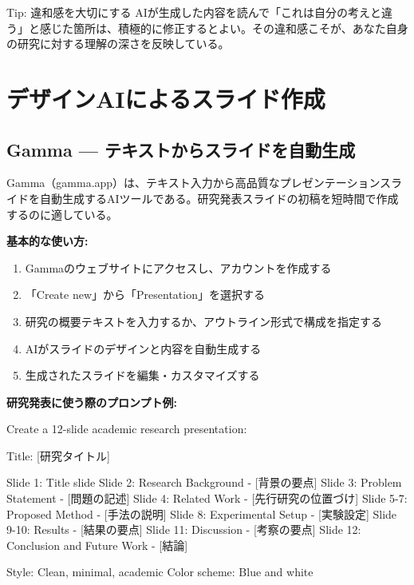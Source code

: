\begin{itembox}[l]{Tip: 違和感を大切にする}
AIが生成した内容を読んで「これは自分の考えと違う」と感じた箇所は、積極的に修正するとよい。その違和感こそが、あなた自身の研究に対する理解の深さを反映している。
\end{itembox}

\section{デザインAIによるスライド作成}
\label{sec:5.4}

\subsection{Gamma --- テキストからスライドを自動生成}

Gamma（gamma.app）は、テキスト入力から高品質なプレゼンテーションスライドを自動生成するAIツールである。研究発表スライドの初稿を短時間で作成するのに適している。

\textbf{基本的な使い方:}

\begin{enumerate}
\item Gammaのウェブサイトにアクセスし、アカウントを作成する
\item 「Create new」から「Presentation」を選択する
\item 研究の概要テキストを入力するか、アウトライン形式で構成を指定する
\item AIがスライドのデザインと内容を自動生成する
\item 生成されたスライドを編集・カスタマイズする
\end{enumerate}

\textbf{研究発表に使う際のプロンプト例:}

\begin{promptbox}
Create a 12-slide academic research presentation:

Title: [研究タイトル]

Slide 1: Title slide
Slide 2: Research Background - [背景の要点]
Slide 3: Problem Statement - [問題の記述]
Slide 4: Related Work - [先行研究の位置づけ]
Slide 5-7: Proposed Method - [手法の説明]
Slide 8: Experimental Setup - [実験設定]
Slide 9-10: Results - [結果の要点]
Slide 11: Discussion - [考察の要点]
Slide 12: Conclusion and Future Work - [結論]

Style: Clean, minimal, academic
Color scheme: Blue and white
\end{promptbox}

